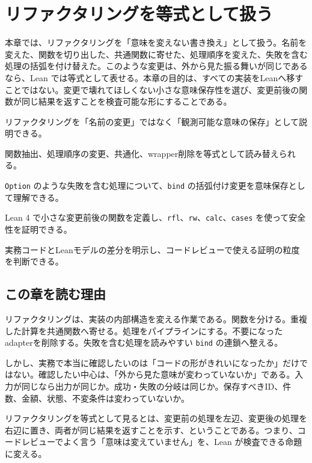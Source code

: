 \chapter{リファクタリングを等式として扱う}
\label{chap:ch28-refactoring-as-equations}

\begin{chapterabstract}
本章では、リファクタリングを「意味を変えない書き換え」として扱う。名前を変えた、関数を切り出した、共通関数に寄せた、処理順序を変えた、失敗を含む処理の括弧を付け替えた。このような変更は、外から見た振る舞いが同じであるなら、Lean では等式として表せる。本章の目的は、すべての実装をLeanへ移すことではない。変更で壊れてほしくない小さな意味保存性を選び、変更前後の関数が同じ結果を返すことを検査可能な形にすることである。
\end{chapterabstract}

\begin{learninggoals}
\item リファクタリングを「名前の変更」ではなく「観測可能な意味の保存」として説明できる。
\item 関数抽出、処理順序の変更、共通化、wrapper削除を等式として読み替えられる。
\item \texttt{Option} のような失敗を含む処理について、\texttt{bind} の括弧付け変更を意味保存として理解できる。
\item Lean 4 で小さな変更前後の関数を定義し、\texttt{rfl}、\texttt{rw}、\texttt{calc}、\texttt{cases} を使って安全性を証明できる。
\item 実務コードとLeanモデルの差分を明示し、コードレビューで使える証明の粒度を判断できる。
\end{learninggoals}

\section{この章を読む理由}

リファクタリングは、実装の内部構造を変える作業である。関数を分ける。重複した計算を共通関数へ寄せる。処理をパイプラインにする。不要になったadapterを削除する。失敗を含む処理を読みやすい \texttt{bind} の連鎖へ整える。

しかし、実務で本当に確認したいのは「コードの形がきれいになったか」だけではない。確認したい中心は、「外から見た意味が変わっていないか」である。入力が同じなら出力が同じか。成功・失敗の分岐は同じか。保存すべきID、件数、金額、状態、不変条件は変わっていないか。

\begin{intuitionbox}
リファクタリングを等式として見るとは、変更前の処理を左辺、変更後の処理を右辺に置き、両者が同じ結果を返すことを示す、ということである。つまり、コードレビューでよく言う「意味は変えていません」を、Lean が検査できる命題に変える。
\end{intuitionbox}

